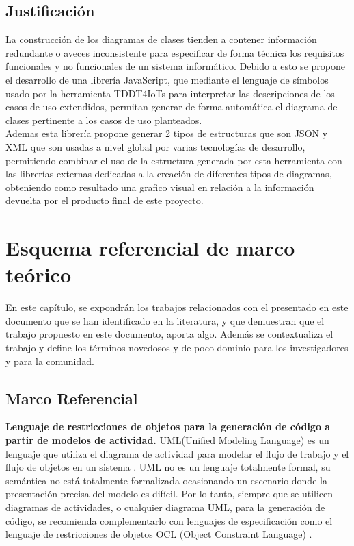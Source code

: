 \documentclass[12pt, openany, xcolor=table]{book}
\begin{document}
	\section{Justificación}
	La construcción de los diagramas de clases tienden a contener información redundante o aveces inconsistente para especificar de forma técnica los requisitos funcionales y no funcionales de un sistema informático. Debido a esto se propone el desarrollo de una librería JavaScript, que mediante el lenguaje de símbolos usado por la herramienta TDDT4IoTs para interpretar las descripciones de los casos de uso extendidos, permitan generar de forma automática el diagrama de clases pertinente a los casos de uso planteados. \\
	
	Ademas esta librería propone generar 2 tipos de estructuras que son JSON y XML que son usadas a nivel global por varias tecnologías de desarrollo, permitiendo combinar el uso de la estructura generada por esta herramienta con las librerías externas dedicadas a la creación de diferentes tipos de diagramas, obteniendo como resultado una grafico visual en relación a la información devuelta por el producto final de este proyecto. 
	
	
	\chapter{Esquema referencial de marco teórico}
	
	En este capítulo, se expondrán los trabajos relacionados con el presentado en este documento que se han identificado en la literatura, y que demuestran que el trabajo propuesto en este documento, aporta algo. Además se contextualiza el trabajo y define los términos novedosos y de poco dominio para los investigadores y para la comunidad.
	
	\section{Marco Referencial}
	
	\textbf{Lenguaje de restricciones de objetos para la generación de código
	a partir de modelos de actividad.} UML(Unified Modeling Language) es un lenguaje que utiliza el diagrama de actividad para modelar el flujo de trabajo y el flujo de objetos en un sistema \cite{Improving}. UML no es un lenguaje totalmente formal, su semántica no está totalmente formalizada ocasionando un escenario donde la presentación precisa del modelo es difícil. Por lo tanto, siempre que se utilicen diagramas de actividades, o cualquier diagrama UML, para la generación de código, se recomienda complementarlo con lenguajes de especificación como el lenguaje de restricciones de objetos OCL (Object Constraint Language) \cite{Object}.   \\
\end{document}
